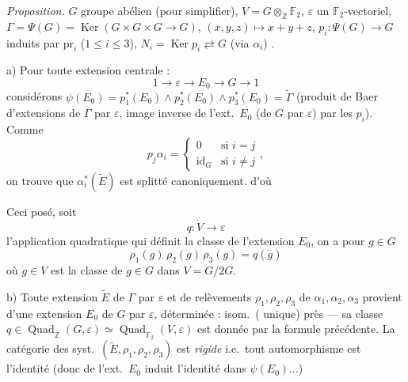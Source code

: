 \documentclass[11pt,a4paper]{article}
\begin{document}

\emph{Proposition.} $G$ groupe abélien (pour simplifier), $V = G \otimes_{\mathbb{Z}}
\mathbb{F}_2$, $\varepsilon$ un $\mathbb{F}_2$-vectoriel, $\Gamma = \Psi(G) =
\operatorname{Ker}(G \times G \times G \to G)$, $(x, y, z) \mapsto x + y + z$,
$p_i : \Psi(G) \to G$ induits par $\mathrm{pr}_i$ ($1 \leqslant i \leqslant 3$),
$N_i = \operatorname{Ker} p_i \rightleftarrows G$ (via $\alpha_i$) .

a) Pour toute extension centrale
 :
\[
1 \to \varepsilon \to E_0 \to G \to 1
\]
considérons $\psi(E_0) = p_1^{*}(E_0) \wedge p_2^{*}(E_0) \wedge p_3^{*}(E_0) =
\tilde{\Gamma}$ (produit de Baer d'extensions de \struck{\ill{}} $\Gamma$ par
$\varepsilon$, image inverse de l'ext.\ $E_0$ (de $G$ par $\varepsilon$) par les
$p_i$). Comme
\[
p_j \alpha_i = \left\lbrace
\begin{array}{ll}
0 & \text{si } i = j \\
\mathrm{id}_G & \text{si } i \neq j
\end{array}
\right. ,
\]
on trouve que $\alpha_i^{*}(\tilde{E})$ est splitté canoniquement.
d'où


Ceci posé, soit
\[
q : \dot{V} \to \varepsilon
\]
 l'application quadratique qui définit la classe de l'extension
$E_0$, on a pour $g \in G$
\[
\rho_1(g)\, \rho_2(g)\, \rho_3(g) = q(\dot{g})
\]
où $\dot{g} \in V$ est la classe de $g \in G$ dans $V = G/2G$.

b) Toute  extension
 $\tilde{E}$ de $\Gamma$ par $\varepsilon$ et de relèvements
$\rho_1, \rho_2, \rho_3$ de $\alpha_1, \alpha_2, \alpha_3$ provient d'une
extension $E_0$ de $G$ par $\varepsilon$, déterminée : isom.\ (
unique) près --- sa classe $q \in \operatorname{Quad}_{\mathbb{Z}}(G, \varepsilon)
\simeq \operatorname{Quad}_{\mathbb{F}_2}(V, \varepsilon)$ est donnée par la
formule précédente. La catégorie  des 
syst.\ $(\tilde{E}, \rho_1, \rho_2, \rho_3)$ est \emph{rigide} i.e.\ tout
automorphisme est l'identité (donc  de l'ext.\ $E_0$ induit
l'identité dans  $\psi(E_0) \ldots$)
\end{document}
